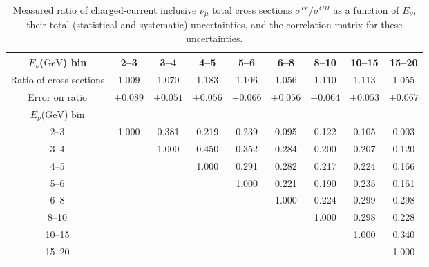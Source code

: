 \documentclass[aps,preprint,showpacs,superscriptaddress]{revtex4} %
\newcommand{\numu}{\ensuremath{\nu_{\mu}}\xspace}
\newcommand{\GeV}{\ensuremath{\mbox{GeV}}\xspace}
\newcommand{\Enu}{\ensuremath{E_{\nu}}\xspace}
\begin{document}
\begingroup
\squeezetable
\begin{table}
  \begin{tabular}{c|cccccccc}
    \hline \hline
    \Enu (\GeV) bin & 2--3 & 3--4 & 4--5 & 5--6 & 6--8 & 8--10 & 10--15 & 15--20 \\ 
    \hline
    Ratio of cross sections & 1.009 & 1.070 & 1.183 & 1.106 & 1.056 & 1.110 & 1.113 & 1.055 \\ 
    Error on ratio & $ \pm 0.089 $ & $ \pm 0.051 $ & $ \pm 0.056 $ & $ \pm 0.066 $ & $ \pm 0.056 $ & $ \pm 0.064 $ & $ \pm 0.053 $ & $ \pm 0.067 $ \\ 
    \hline
    \Enu (\GeV) bin &  &  &  &  &  &  &  &  \\ 
    2--3 & 1.000 & 0.381 & 0.219 & 0.239 & 0.095 & 0.122 & 0.105 & 0.003 \\ 
    3--4 &  & 1.000 & 0.450 & 0.352 & 0.284 & 0.200 & 0.207 & 0.120 \\ 
    4--5 &  &  & 1.000 & 0.291 & 0.282 & 0.217 & 0.224 & 0.166 \\ 
    5--6 &  &  &  & 1.000 & 0.221 & 0.190 & 0.235 & 0.161 \\ 
    6--8 &  &  &  &  & 1.000 & 0.224 & 0.299 & 0.298 \\ 
    8--10 &  &  &  &  &  & 1.000 & 0.298 & 0.228 \\ 
    10--15 &  &  &  &  &  &  & 1.000 & 0.340 \\ 
    15--20 &  &  &  &  &  &  &  & 1.000 \\ 
    \hline \hline
  \end{tabular}
  \caption{Measured ratio of charged-current inclusive \numu total cross sections $\sigma^{Fe}/\sigma^{CH}$ as a function of \Enu, their total (statistical and systematic) uncertainties, and the correlation matrix for these uncertainties.}
  \label{tab:Enu_ratio_26_92_results_table}
\end{table}
\endgroup
\end{document}
